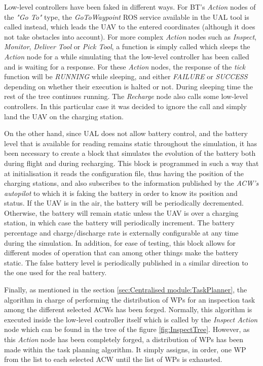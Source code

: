 \documentclass[fontsize=11pt, English=false, Español=true, Myfinal=true, twoside, numbers=noenddot]{scrbook}
\begin{document}
{Low-level controllers have been faked in different ways. For \gls{BT}'s \emph{Action} nodes of the \emph{"Go To"} type, the \emph{GoToWaypoint} \gls{ROS} service available in the \gls{UAL} tool is called instead, which leads the \gls{UAV} to the entered coordinates (although it does not take obstacles into account). For more complex \emph{Action} nodes such as \emph{Inspect}, \emph{Monitor}, \emph{Deliver Tool} or \emph{Pick Tool}, a function is simply called which sleeps the \emph{Action} node for a while simulating that the low-level controller has been called and is waiting for a response. For these \emph{Action} nodes, the response of the \emph{tick} function will be \emph{RUNNING} while sleeping, and either \emph{FAILURE} or \emph{SUCCESS} depending on whether their execution is halted or not. During sleeping time the rest of the tree continues running. The \emph{Recharge} node also calls some low-level controllers. In this particular case it was decided to ignore the call and simply land the \gls{UAV} on the charging station.

On the other hand, since \gls{UAL} does not allow battery control, and the battery level that is available for reading remains static throughout the simulation, it has been necessary to create a block that simulates the evolution of the battery both during flight and during recharging. This block is programmed in such a way that at initialisation it reads the configuration file, thus having the position of the charging stations, and also subscribes to the information published by the \emph{\gls{ACW}'s autopilot} to which it is faking the battery in order to know its position and status. If the \gls{UAV} is in the air, the battery will be periodically decremented. Otherwise, the battery will remain static unless the \gls{UAV} is over a charging station, in which case the battery will periodically increment. The battery percentage and charge/discharge rate is externally configurable at any time during the simulation. In addition, for ease of testing, this block allows for different modes of operation that can among other things make the battery static. The false battery level is periodically published in a similar direction to the one used for the real battery.

Finally, as mentioned in the section \ref{sec:Centralised module:TaskPlanner}, the algorithm in charge of performing the distribution of \glspl{WP} for an inspection task among the different selected \glspl{ACW} has been forged. Normally, this algorithm is executed inside the low-level controller itself which is called by the \emph{Inspect Action} node which can be found in the tree of the figure \ref{fig:InspectTree}. However, as this \emph{Action} node has been completely forged, a distribution of \glspl{WP} has been made within the task planning algorithm. It simply assigns, in order, one \gls{WP} from the list to each selected \gls{ACW} until the list of \glspl{WP} is exhausted.
%
%
%
% 
}
\end{document}

